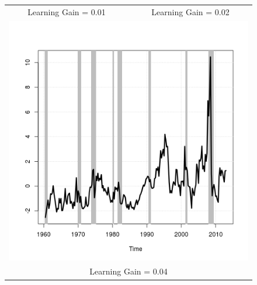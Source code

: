 \documentclass[11pt]{article}
\begin{document}
\begin{figure}
\begin{tabular}{cc}
Learning Gain = 0.01 & Learning Gain = 0.02 \\ 
\multicolumn{2}{c}{\includegraphics[scale=0.5]{./results/pics0.04/fpucoin.png}} \\
\multicolumn{2}{c}{Learning Gain = 0.04} 
\end{tabular}
\end{figure} 
\end{document}
